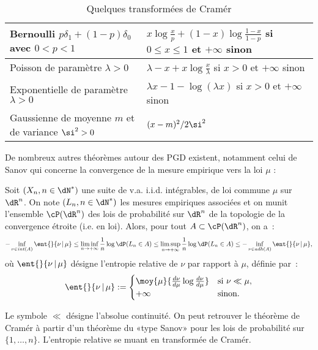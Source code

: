 \begin{table}[htbp]
  \begin{center}\small
    \begin{tabular}[c]{|l|l|}\hline
      Bernoulli $p\delta_1 + (1-p)\delta_0$ avec $0<p<1$&
      $x\log\frac{x}{p} + (1-x)\log\frac{1-x}{1-p}$ si
      $0\leq x\leq 1$ et $+\infty$ sinon \\ \hline
      Poisson de paramètre $\lambda>0$ &
      $\lambda-x+x\log\frac{x}{\lambda}$ si $x>0$ et $+\infty$ sinon \\ \hline
      Exponentielle de paramètre $\lambda>0$ &
      $\lambda x -1 -\log(\lambda x)$ si $x>0$ et $+\infty$ sinon\\ \hline
      Gaussienne de moyenne $m$ et de variance $\si^2>0$ &
      $(x-m)^2/{2\si^2}$ \\ \hline
    \end{tabular}
    \caption{Quelques transformées de Cramér}
    \label{tab:exple-transfo-cramer}
  \end{center}
\end{table}
De nombreux autres théorèmes autour des PGD existent, notamment celui de Sanov
qui concerne la convergence de la mesure empirique vers la loi $\mu$ :
\begin{thm}
  Soit $(X_n,n\in\dN^*)$ une suite de v.a. i.i.d. intégrables, de loi commune
  $\mu$ sur $\dR^n$. On note $(L_n,n\in\dN^*)$ les mesures empiriques associées et
  on munit l'ensemble $\cP(\dR^n)$ des lois de probabilité sur $\dR^n$ de la
  topologie de la convergence étroite (i.e. en loi).  Alors, pour tout
  $A\subset\cP(\dR^n)$, on a~:
$$
-\inf_{\nu\in int(A)} \ent{}{\nu\,\vert\,\mu}
\leq
\liminf_{n\to+\infty} \frac{1}{n}\log\dP(L_n\in A)
\leq 
\limsup_{n\to+\infty} \frac{1}{n}\log\dP(L_n\in A)
\leq
-\inf_{\nu\in adh(A)} \ent{}{\nu\,\vert\,\mu},
$$
où $\ent{}{\nu\,\vert\,\mu}$ désigne l'entropie relative de $\nu$ par rapport
à $\mu$, définie par~:
$$
\ent{}{\nu\,\vert\,\mu}:=
\begin{cases}
\moy{\mu}{\frac{d\nu}{d\mu}\log \frac{d\nu}{d\mu}} & \text{si } \nu \ll \mu,\\
+\infty & \text{sinon}.
\end{cases}
$$
\end{thm}
Le symbole $\ll$ désigne l'absolue continuité. On peut retrouver le théorème
de Cramér à partir d'un théorème du «type Sanov» pour les lois de probabilité
sur $\{1,\ldots,n\}$. L'entropie relative se muant en transformée de Cramér.

